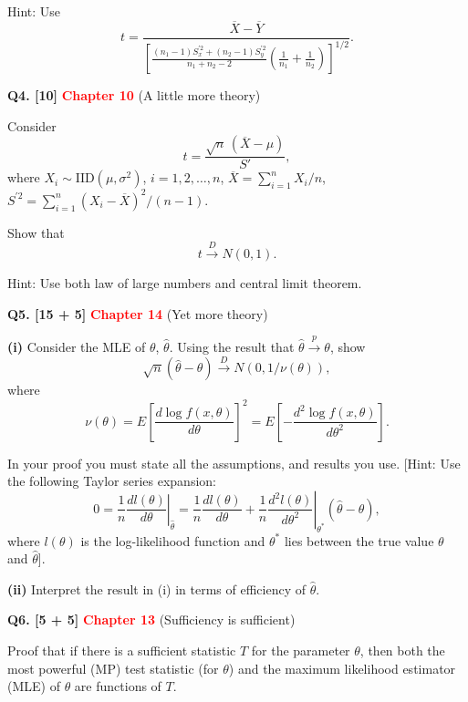 \documentclass[11pt]{article}
\begin{document}
Hint: Use
\[
t=\frac{\overline X-\overline Y}{\left[\frac{(n_1-1)S_x^{\prime 2}+(n_2-1)S_y^{\prime 2}}{n_1+n_2-2}\left(\frac{1}{n_1}+\frac{1}{n_2}\right)\right]^{1/2}}.
\]

\bigskip

\textbf{Q4. [10]} \textbf{\textcolor{red}{Chapter 10}} (A little more theory)

Consider
\[
t=\frac{\sqrt n\,(\overline X-\mu)}{S'},
\]
where $X_i\sim\mathrm{IID}(\mu,\sigma^2)$, $i=1,2,\ldots,n$, $\overline X=\sum_{i=1}^{n}X_i/n$, $S^{\prime 2}=\sum_{i=1}^{n}(X_i-\overline X)^2/(n-1)$.

Show that
\[
t\overset{D}{\longrightarrow}N(0,1).
\]

Hint: Use both law of large numbers and central limit theorem.

\bigskip

\textbf{Q5. [15 + 5]} \textbf{\textcolor{red}{Chapter 14}} (Yet more theory)

\textbf{(i)} Consider the MLE of $\theta$, $\hat\theta$. Using the result that $\hat\theta\overset{p}{\longrightarrow}\theta$, show
\[
\sqrt n(\hat\theta-\theta)\overset{D}{\longrightarrow}N\!\left(0,1/\nu(\theta)\right),
\]
where
\[
\nu(\theta)=E\left[\frac{d\log f(x,\theta)}{d\theta}\right]^2
=E\left[-\frac{d^2\log f(x,\theta)}{d\theta^2}\right].
\]

In your proof you must state all the assumptions, and results you use. [Hint: Use the following Taylor series expansion:
\[
0=\left.\frac{1}{n}\frac{dl(\theta)}{d\theta}\right|_{\hat\theta}
=\frac{1}{n}\frac{dl(\theta)}{d\theta}
+\left.\frac{1}{n}\frac{d^2l(\theta)}{d\theta^2}\right|_{\theta^*}(\hat\theta-\theta),
\]
where $l(\theta)$ is the log-likelihood function and $\theta^*$ lies between the true value $\theta$ and $\hat\theta$].

\textbf{(ii)} Interpret the result in (i) in terms of efficiency of $\hat\theta$.

\bigskip

\textbf{Q6. [5 + 5]} \textbf{\textcolor{red}{Chapter 13}} (Sufficiency is sufficient)

Proof that if there is a sufficient statistic $T$ for the parameter $\theta$, then both the most powerful (MP) test statistic (for $\theta$) and the maximum likelihood estimator (MLE) of $\theta$ are functions of $T$.


\clearpage
\end{document}
